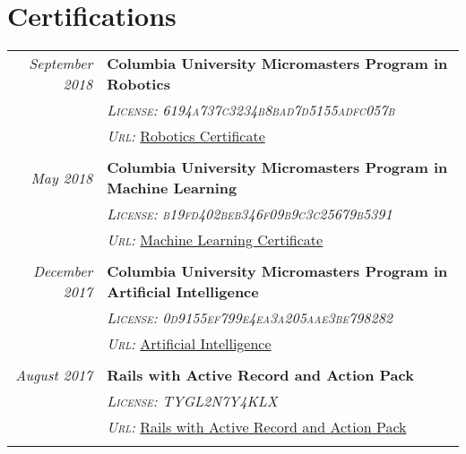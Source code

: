 \documentclass[a4paper,10pt]{article}
\begin{document}
\section{Certifications}
\begin{tabular}{r|p{11cm}}
\emph{September 2018} & \textbf{Columbia University Micromasters Program in Robotics}\\  & \emph{\textsc{License: 6194a737c3234b8bad7d5155adfc057b}} \\&\emph{\textsc{Url:}}  \href{https://courses.edx.org/certificates/6194a737c3234b8bad7d5155adfc057b}{Robotics Certificate} \\\multicolumn{2}{c}{} \\

\emph{May 2018} & \textbf{Columbia University Micromasters Program in Machine Learning}\\  & \emph{\textsc{License: b19fd402beb346f09b9c3c25679b5391}} \\&\emph{\textsc{Url:}}  \href{https://courses.edx.org/certificates/b19fd402beb346f09b9c3c25679b5391}{Machine Learning Certificate} \\\multicolumn{2}{c}{} \\
\emph{December 2017} & \textbf{Columbia University Micromasters Program in Artificial Intelligence}\\  & \emph{\textsc{License: 0d9155ef799e4ea3a205aae3be798282}} \\&\emph{\textsc{Url:}}  \href{https://courses.edx.org/certificates/0d9155ef799e4ea3a205aae3be798282}{Artificial Intelligence} \\\multicolumn{2}{c}{} \\
\emph{August 2017} & \textbf{Rails with Active Record and Action Pack}\\  & \emph{\textsc{License: TYGL2N7Y4KLX}} \\&\emph{\textsc{Url:}}  \href{https://www.coursera.org/account/accomplishments/certificate/TYGL2N7Y4KLX}{Rails with Active Record and Action Pack} \\\multicolumn{2}{c}{} \\

\end{tabular}
\end{document}
